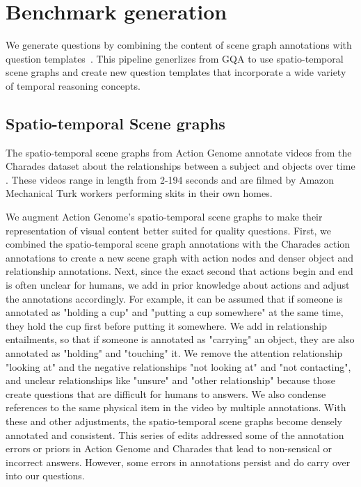 
\section{Benchmark generation}

We generate questions by combining the content of scene graph annotations with question templates~\cite{hudson2019gqa}. This pipeline generlizes from GQA to use spatio-temporal scene graphs and create new question templates that incorporate a wide variety of temporal reasoning concepts. 

\subsection{Spatio-temporal Scene graphs}

The spatio-temporal scene graphs from Action Genome annotate videos from the Charades dataset about the relationships between a subject and objects over time \cite{ji2020action, sigurdsson2016hollywood}. These videos range in length from 2-194 seconds and are filmed by Amazon Mechanical Turk workers performing skits in their own homes.

We augment Action Genome's spatio-temporal scene graphs to make their representation of visual content better suited for quality questions. First, we combined the spatio-temporal scene graph annotations with the Charades action annotations to create a new scene graph with action nodes and denser object and relationship annotations. Next, since the exact second that actions begin and end is often unclear for humans, we add in prior knowledge about actions and adjust the annotations accordingly. For example, it can be assumed that if someone is annotated as "holding a cup" and "putting a cup somewhere" at the same time, they hold the cup first before putting it somewhere. We add in relationship entailments, so that if someone is annotated as "carrying" an object, they are also annotated as "holding" and "touching" it. We remove the attention relationship "looking at" and the negative relationships "not looking at" and "not contacting", and unclear relationships like "unsure" and "other relationship" because those create questions that are difficult for humans to answers. We also condense references to the same physical item in the video by multiple annotations. With these and other adjustments, the spatio-temporal scene graphs become densely annotated and consistent. This series of edits addressed some of the annotation errors or priors in Action Genome and Charades that lead to non-sensical or incorrect answers. However, some errors in annotations persist and do carry over into our questions.

